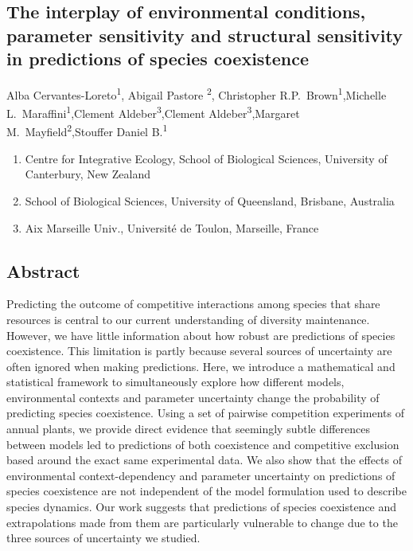 \begin{refsection}
\chapter{The interplay of environmental conditions, parameter sensitivity and structural sensitivity in predictions of species coexistence} %
\label{Bayesian_competition}

\noindent Alba Cervantes-Loreto\textsuperscript{1}, Abigail Pastore \textsuperscript{2}, Christopher R.P.\ Brown\textsuperscript{1},Michelle L.\ Maraffini\textsuperscript{1},Clement Aldeber\textsuperscript{3},Clement Aldeber\textsuperscript{3},Margaret M.\ Mayfield\textsuperscript{2},Stouffer Daniel B.\textsuperscript{1}

\begin{enumerate}
    \item Centre for Integrative Ecology, School of Biological Sciences, University of Canterbury, New Zealand
    \item School of Biological Sciences, University of Queensland, Brisbane, Australia
    \item Aix Marseille Univ., Université de Toulon,  Marseille, France
\end{enumerate}

\section*{Abstract}


Predicting the outcome of competitive interactions among species that share resources is central to our current understanding of diversity maintenance. However, we have little information about how robust are predictions of species coexistence. This limitation is partly because several sources of uncertainty are often ignored when making predictions. Here, we introduce a mathematical and statistical framework to simultaneously explore how different models, environmental contexts and parameter uncertainty change the probability of predicting species coexistence.  Using a set of pairwise competition experiments of annual plants, we provide direct evidence that seemingly subtle differences between models led to predictions of both coexistence and competitive exclusion based around the exact same experimental data. We also show that the effects of environmental context-dependency and parameter uncertainty on predictions of species coexistence are not independent of the model formulation used to describe species dynamics. Our work suggests that predictions of species coexistence and extrapolations made from them are particularly vulnerable to change due to the three sources of uncertainty we studied.


\end{refsection}
